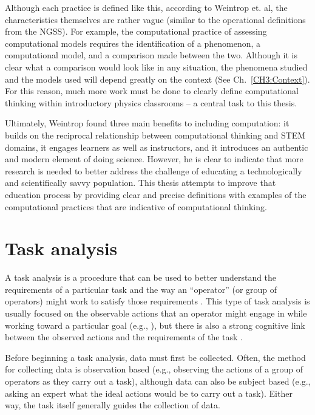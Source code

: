 \documentclass{msuphddissertation}
\begin{document}
\begin{doublespace}
Although each practice is defined like this, according to Weintrop et. al, the characteristics themselves are rather vague (similar to the operational definitions from the NGSS).  For example, the computational practice of assessing computational models requires the identification of a phenomenon, a computational model, and a comparison made between the two.  Although it is clear what a comparison would look like in any situation, the phenomena studied and the models used will depend greatly on the context (See Ch.~\ref{CH3:Context}).  For this reason, much more work must be done to clearly define computational thinking within introductory physics classrooms -- a central task to this thesis.

Ultimately, Weintrop found three main benefits to including computation: it builds on the reciprocal relationship between computational thinking and STEM domains, it engages learners as well as instructors, and it introduces an authentic and modern element of doing science.  However, he is clear to indicate that more research is needed to better address the challenge of educating a technologically and scientifically savvy population.  This thesis attempts to improve that education process by providing clear and precise definitions with examples of the computational practices that are indicative of computational thinking.

\section{Task analysis}

A task analysis is a procedure that can be used to better understand the requirements of a particular task and the way an ``operator'' (or group of operators) might work to satisfy those requirements \cite{Kirwan2005}.  This type of task analysis is usually focused on the observable actions that an operator might engage in while working toward a particular goal (e.g., ), but there is also a strong cognitive link between the observed actions and the requirements of the task \cite{Crandall2006}.

Before beginning a task analysis, data must first be collected.  Often, the method for collecting data is observation based (e.g., observing the actions of a group of operators as they carry out a task), although data can also be subject based (e.g., asking an expert what the ideal actions would be to carry out a task).  Either way, the task itself generally guides the collection of data.


\end{doublespace}
\end{document}

